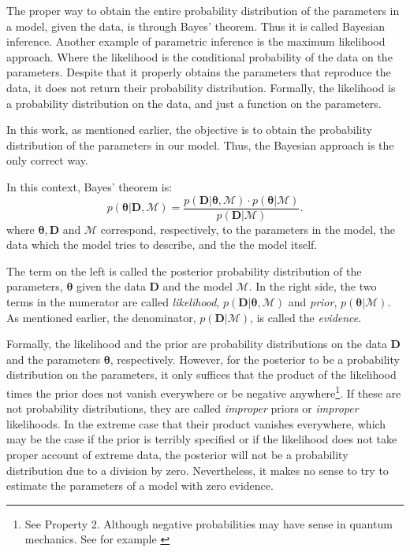 The proper way to obtain the entire probability distribution of the parameters in a model, given the data, is through Bayes' theorem. Thus it is called Bayesian inference. Another example of parametric inference is the maximum likelihood approach. Where the likelihood is the conditional probability of the data on the parameters. Despite that it properly obtains the parameters that reproduce the data, it does not return their probability distribution. Formally, the likelihood is a probability distribution on the data, and just a function on the parameters.

In this work, as mentioned earlier, the objective is to obtain the probability distribution of the parameters in our model. Thus,  the Bayesian approach is the only correct way.

In this context, Bayes' theorem is:
\begin{equation}
p(\mathbf{\theta}|\mathbf{D},\mathcal{M}) = \frac{p(\mathbf{D}|\mathbf{\theta},\mathcal{M})\cdot p(\mathbf{\theta}|\mathcal{M})}{p(\mathbf{D}|\mathcal{M})}.
\end{equation}
where $\mathbf{\theta},\mathbf{D}$ and $\mathcal{M}$ correspond, respectively, to the parameters in the model, the data which the model tries 
to describe, and the the model itself. 

The term on the left is called the posterior probability distribution of the parameters, $\mathbf{\theta}$ given the data $\mathbf{D}$ and the model $\mathcal{M}$. In the right side, the two terms in the numerator are called \emph{likelihood}, $p(\mathbf{D}|\mathbf{\theta},\mathcal{M})$ and \emph{prior}, $p(\mathbf{\theta}|\mathcal{M})$. As mentioned earlier, the denominator, $p(\mathbf{D}|\mathcal{M})$, is called the \emph{evidence}. 

Formally, the likelihood and the prior are probability distributions on the data $\mathbf{D}$ and the parameters $\mathbf{\theta}$, respectively. However, for the posterior to be a probability distribution on the parameters, it only suffices that the product of the likelihood times the prior does not vanish everywhere or be negative anywhere\footnote{See Property 2. Although negative probabilities may have sense in quantum mechanics. See for example \citet{1942RSPSA.180....1D}}. If these are not probability distributions, they are called \emph{improper} priors or \emph{improper} likelihoods. In the extreme case that their product vanishes everywhere, which may be the case if the prior is terribly specified or if the likelihood does not take proper account of extreme data, the posterior will not be a probability distribution due to a division by zero. Nevertheless, it makes no sense to try to estimate the parameters of a model with zero evidence.

